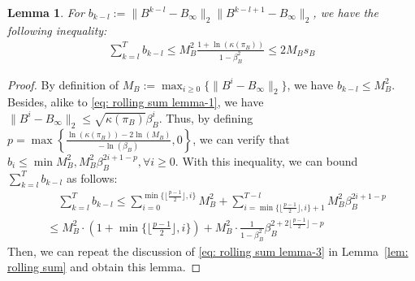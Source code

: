\documentclass{article}
\newtheorem{lemma}[thm]{Lemma}
\newcommand{\norm}[1]{\| #1 \|}
\begin{document}
\begin{lemma}\label{lemma: gradient consensus decomposition part 2-trick}
For $b_{k-l}:=\norm{B^{k-l}-B_\infty}_2\norm{B^{k-l+1}-B_\infty}_2$, we have the following inequality:
    \begin{align}
        \sum_{k=l}^T b_{k-l}\le M_B^2\frac{1+\ln(\kappa(\pi_B))}{1-\beta_B^2}\le 2M_Bs_B
    \end{align}
\end{lemma}
\begin{proof}
    By definition of $M_B:=\max_{i\ge0}\{\norm{B^i-B_\infty}_2\}$, we have $b_{k-l}\le M_B^2$. Besides, alike to \eqref{eq: rolling sum lemma-1}, we have $\norm{B^i-B_\infty}_2\le \sqrt{\kappa(\pi_B)}\beta_B^i$. Thus, by defining $p=\max\left\{\frac{\ln(\kappa(\pi_B))-2\ln(M_B)}{-\ln(\beta_B)},0\right\}$, we can verify that $b_{i}\le \min{M_B^2,M_B^2\beta_B^{2i+1-p}},\forall i \ge 0$. With this inequality, we can bound $\sum_{k=l}^Tb_{k-l}$ as follows:
    \begin{align}
        &\quad\sum_{k=l}^Tb_{k-l} \le \sum_{i=0}^{\min\{\lfloor \frac{p-1}{2} \rfloor, i\}}M_B^2+\sum_{i=\min\{\lfloor \frac{p-1}{2} \rfloor, i\}+1}^{T-l}M_B^2\beta_B^{2i+1-p}\nonumber\\
        &\le M_B^2\cdot(1+\min\{\lfloor \frac{p-1}{2} \rfloor, i\})+M_B^2\cdot\frac{1}{1-\beta_B^2}\beta_B^{2+2\lfloor \frac{p-1}{2}\rfloor-p}
    \end{align}
Then, we can repeat the discussion of \eqref{eq: rolling sum lemma-3} in Lemma~\ref{lem: rolling sum} and obtain this lemma.
\end{proof}
\end{document}
